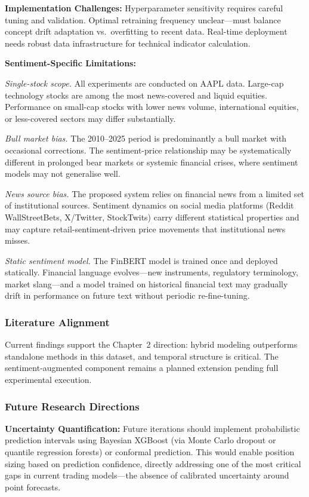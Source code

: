 \textbf{Implementation Challenges:}  
Hyperparameter sensitivity requires careful tuning and validation. Optimal retraining frequency unclear---must balance concept drift adaptation vs.\ overfitting to recent data. Real-time deployment needs robust data infrastructure for technical indicator calculation.

\textbf{Sentiment-Specific Limitations:}

\textit{Single-stock scope.} All experiments are conducted on AAPL data. Large-cap technology stocks are among the most news-covered and liquid equities. Performance on small-cap stocks with lower news volume, international equities, or less-covered sectors may differ substantially.

\textit{Bull market bias.} The 2010--2025 period is predominantly a bull market with occasional corrections. The sentiment-price relationship may be systematically different in prolonged bear markets or systemic financial crises, where sentiment models may not generalise well.

\textit{News source bias.} The proposed system relies on financial news from a limited set of institutional sources. Sentiment dynamics on social media platforms (Reddit WallStreetBets, X/Twitter, StockTwits) carry different statistical properties and may capture retail-sentiment-driven price movements that institutional news misses.

\textit{Static sentiment model.} The FinBERT model is trained once and deployed statically. Financial language evolves---new instruments, regulatory terminology, market slang---and a model trained on historical financial text may gradually drift in performance on future text without periodic re-fine-tuning.

\subsubsection{Literature Alignment}

Current findings support the Chapter~2 direction: hybrid modeling outperforms standalone methods in this dataset, and temporal structure is critical. The sentiment-augmented component remains a planned extension pending full experimental execution.

\subsubsection{Future Research Directions}

\textbf{Uncertainty Quantification:} Future iterations should implement probabilistic prediction intervals using Bayesian XGBoost (via Monte Carlo dropout or quantile regression forests) or conformal prediction. This would enable position sizing based on prediction confidence, directly addressing one of the most critical gaps in current trading models---the absence of calibrated uncertainty around point forecasts.

